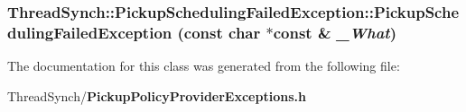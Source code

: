 \subsubsection{\setlength{\rightskip}{0pt plus 5cm}Thread\-Synch::Pickup\-Scheduling\-Failed\-Exception::Pickup\-Scheduling\-Failed\-Exception (const char $\ast$const \& {\em \_\-What})\hspace{0.3cm}{\tt  [inline]}}\label{class_thread_synch_1_1_pickup_scheduling_failed_exception_558c222aba7624c51b4538ae39b9b3c4}




The documentation for this class was generated from the following file:\begin{CompactItemize}
\item 
Thread\-Synch/{\bf Pickup\-Policy\-Provider\-Exceptions.h}\end{CompactItemize}
